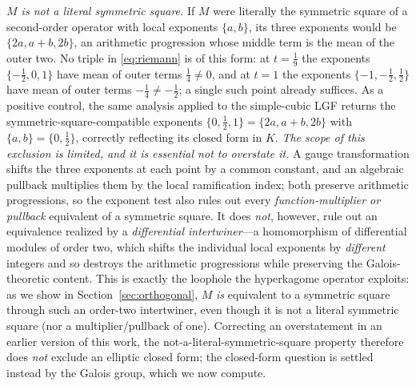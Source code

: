 \documentclass[11pt]{article}
\theoremstyle{plain}
\theoremstyle{remark}
\begin{document}
\emph{$M$ is not a literal symmetric square.} If $M$ were literally the symmetric square of a second-order operator
with local exponents $\{a,b\}$, its three exponents would be $\{2a,a+b,2b\}$, an arithmetic progression whose middle
term is the mean of the outer two. No triple in \eqref{eq:riemann} is of this form: at $t=\tfrac19$ the exponents
$\{-\tfrac12,0,1\}$ have mean of outer terms $\tfrac14\neq0$, and at $t=1$ the exponents $\{-1,-\tfrac12,\tfrac12\}$
have mean of outer terms $-\tfrac14\neq-\tfrac12$; a single such point already suffices. As a
positive control, the same analysis applied to the simple-cubic LGF returns the symmetric-square-compatible
exponents $\{0,\tfrac12,1\}=\{2a,a+b,2b\}$ with $\{a,b\}=\{0,\tfrac12\}$, correctly reflecting its closed form in
$K$. \emph{The scope of this exclusion is limited, and it is essential not to overstate it.} A gauge transformation
shifts the three exponents at each point by a common constant, and an algebraic pullback multiplies them by the
local ramification index; both preserve arithmetic progressions, so the exponent test also rules out every
\emph{function-multiplier or pullback} equivalent of a symmetric square. It does \emph{not}, however, rule out an
equivalence realized by a \emph{differential intertwiner}---a homomorphism of differential modules of order two,
which shifts the individual local exponents by \emph{different} integers and so destroys the arithmetic
progressions while preserving the Galois-theoretic content. This is exactly the loophole the hyperkagome operator
exploits: as we show in Section~\ref{sec:orthogonal}, $M$ \emph{is} equivalent to a symmetric square through such an
order-two intertwiner, even though it is not a literal symmetric square (nor a multiplier/pullback of one). Correcting an overstatement in
an earlier version of this work, the not-a-literal-symmetric-square property therefore does \emph{not} exclude an
elliptic closed form; the closed-form question is settled instead by the Galois group, which we now compute.
\end{document}
